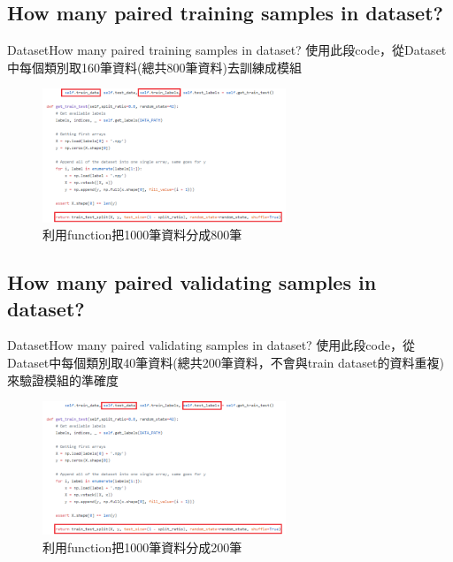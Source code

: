 \documentclass{beamer}
\begin{document}
\begin{CJK}{UTF8}{nkai}
\subsection{How many paired training samples in dataset?}
\begin{frame}{Dataset}{How many paired training samples in  dataset?}
使用此段code，從Dataset中每個類別取160筆資料(總共800筆資料)去訓練成模組
\newline
\newline
\begin{figure}
\begin{center} 
\includegraphics[height=4cm]{SperateCode_TrainData.png}
\end{center}
\caption{利用function把1000筆資料分成800筆}
\end{figure}
\end{frame}
\subsection{How many paired validating samples in dataset?}
\begin{frame}{Dataset}{How many paired validating samples in  dataset?}
使用此段code，從Dataset中每個類別取40筆資料(總共200筆資料，不會與train dataset的資料重複)來驗證模組的準確度
\newline
\newline
\begin{figure}
\begin{center} 
\includegraphics[height=4cm]{SperateCode_ValidatingData.png}
\end{center}
\caption{利用function把1000筆資料分成200筆}
\end{figure}
\end{frame}

\end{CJK}
\end{document}
